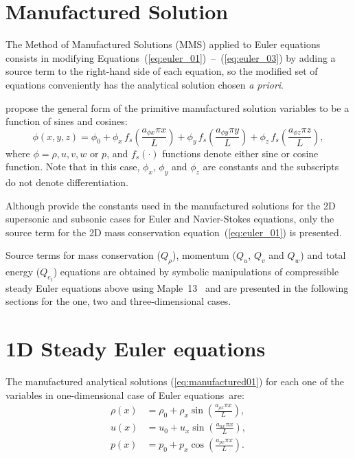 \documentclass[10pt]{article}
\begin{document}
\section{Manufactured Solution}

The Method of Manufactured Solutions (MMS) applied to Euler equations consists in modifying Equations~(\ref{eq:euler_01})~--~(\ref{eq:euler_03}) by adding a source term to the right-hand side of each equation, so the modified set of equations conveniently has the analytical solution chosen \textit{a priori}.

\citet{Roy2002} propose the general form of the primitive manufactured solution variables to be  a function of sines and cosines:
\begin{equation}
 \label{eq:manufactured01}
  \phi (x,y,z) = \phi_0+ \phi_x\, f_s \left(\frac{a_{\phi x} \pi x}{L} \right) +  \phi_y \,f_s\left(\frac{a_{\phi y} \pi y}{L}\right) + \phi_z \,f_s\left(\frac{a_{\phi z} \pi z}{L}\right),
\end{equation}
where $\phi=\rho,u,v,w$ or $p$, and $f_s(\cdot)$ functions denote either sine or cosine function. Note that in this case, $\phi_x$, $\phi_y$  and $\phi_z$ are constants  and the subscripts do not denote differentiation.



Although \citet{Roy2002} provide the constants used in the manufactured solutions for the 2D supersonic and subsonic cases for Euler and Navier-Stokes equations, only the source term for the 2D mass conservation equation~(\ref{eq:euler_01}) is presented.


Source terms  for mass conservation ($Q_\rho$), momentum ($Q_u$, $Q_v$ and $Q_w$)  and total energy ($Q_{e_t}$) equations are obtained by symbolic manipulations of compressible steady Euler equations above using Maple~13~\citep{Maple} and are presented in the following sections for the one, two and three-dimensional cases.


\section{1D Steady Euler equations}

The manufactured analytical solutions (\ref{eq:manufactured01}) for each one of the variables in one-dimensional case of Euler equations~are:
\begin{equation}
\begin{split}
\label{eq:manufactured_1d}
\rho\left(x\right) &=  \rho_{0}+ \rho_{x} \sin\left(\frac{a_{ \rho x} \pi x}{L}\right),\\
u\left(x\right) &= u_{0}+u_{x} \sin\left(\frac{a_{u x} \pi x}{L}\right),\\
p\left(x\right) &= p_{0}+p_{x} \cos\left(\frac{a_{p x} \pi x}{L}\right).\\
\end{split}
\end{equation}
\end{document}
